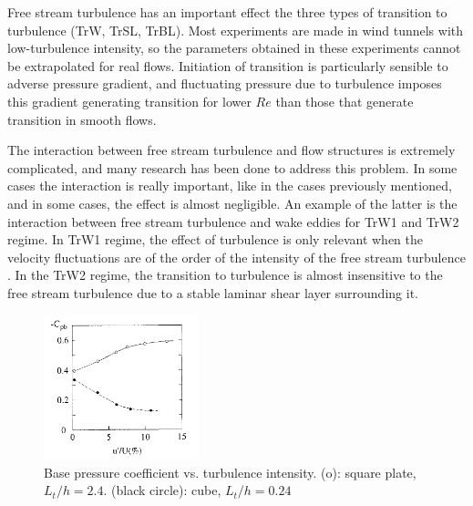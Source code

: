 \documentclass[journal]{new-aiaa}
\begin{document}
Free stream turbulence has an important effect the three types of transition to turbulence (TrW, TrSL, TrBL). Most experiments are made in wind tunnels with low-turbulence intensity, so the parameters obtained in these experiments cannot be extrapolated for real flows. Initiation of transition is particularly sensible to adverse pressure gradient, and fluctuating pressure due to turbulence imposes this gradient generating transition for lower $Re$ than those that generate transition in smooth flows.


The interaction between free stream turbulence and flow structures is extremely complicated, and many research has been done to address this problem. In some cases the interaction is really important, like in the cases previously mentioned, and in some cases, the effect is almost negligible. An example of the latter is the interaction between free stream turbulence and wake eddies for TrW1 and TrW2 regime. In TrW1 regime, the effect of turbulence is only relevant when the velocity fluctuations are of the order of the intensity of the free stream turbulence \citep{Zdravkovich1997}. In the TrW2 regime, the transition to turbulence is almost insensitive to the free stream turbulence due to a stable laminar shear layer surrounding it.

\begin{figure}[H]
\begin{center}
\includegraphics[width=0.4\textwidth]{Images/federico/Figure09}
\caption{Base pressure coefficient vs. turbulence intensity. (o): square plate, $L_t/h=2.4$. (black circle): cube, $L_t/h=0.24$ \cite{nakamura1993bluffbody}}
\label{fig:Nakamura01}
\end{center}
\end{figure}
\end{document}
